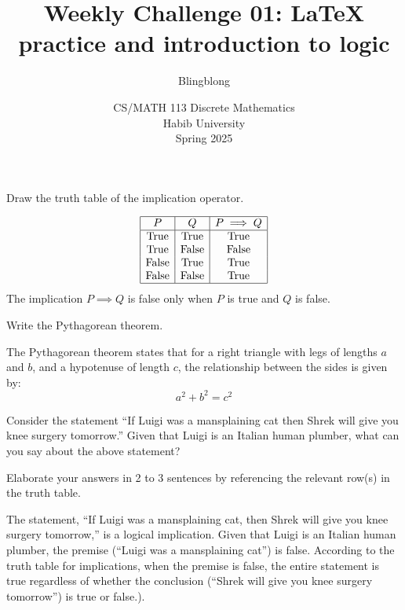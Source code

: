 \documentclass[a4paper]{exam}
\title{Weekly Challenge 01: \LaTeX\; practice and introduction to logic}
\author{Blingblong} %
\date{CS/MATH 113 Discrete Mathematics\\Habib University\\Spring 2025}
\begin{document}
\maketitle

\begin{questions}

 Draw the truth table of the implication operator.

\begin{solution}
\[
\begin{array}{|c|c|c|}
\hline
P & Q & P \implies Q \\
\hline
\text{True} & \text{True} & \text{True} \\
\text{True} & \text{False} & \text{False} \\
\text{False} & \text{True} & \text{True} \\
\text{False} & \text{False} & \text{True} \\
\hline
\end{array}
\]
The implication \(P \implies Q\) is false only when \(P\) is true and \(Q\) is false.
\end{solution}

 Write the Pythagorean theorem.

\begin{solution}
The Pythagorean theorem states that for a right triangle with legs of lengths \(a\) and \(b\), and a hypotenuse of length \(c\), the relationship between the sides is given by:
\[
a^2 + b^2 = c^2
\]
\end{solution}

 Consider the statement ``If Luigi was a mansplaining cat then Shrek will give you knee surgery tomorrow.'' Given that Luigi is an Italian human plumber, what can you say about the above statement?

Elaborate your answers in 2 to 3 sentences by referencing the relevant row(s) in the truth table.

\begin{solution}
The statement, “If Luigi was a mansplaining cat, then Shrek will give you knee surgery tomorrow,” is a logical implication. Given that Luigi is an Italian human plumber, the premise (“Luigi was a mansplaining cat”) is false. According to the truth table for implications, when the premise is false, the entire statement is true regardless of whether the conclusion (“Shrek will give you knee surgery tomorrow”) is true or false.).
\end{solution}

\end{questions}
\end{document}
